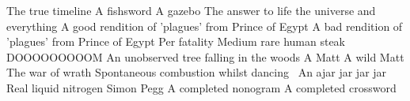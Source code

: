 \begin{multicols}{2}
\begin{small}
\begin{tabbing}
          {The true timeline}
          {A fishsword}
          {A gazebo}
           {The answer to life the universe and everything \FD}
           {A good rendition of 'plagues' from Prince of Egypt}
          {A bad rendition of 'plagues' from Prince of Egypt}
         {Per fatality}
          {Medium rare human steak}
           {DOOOOOOOOOM}
           {An unobserved tree falling in the woods}
           {A Matt}
           {A wild Matt}
           {The war of wrath}
         {Spontaneous combustion whilst dancing~\E}
           {An ajar jar jar jar}
          {Real liquid nitrogen}
          {Simon Pegg}
          {A completed nonogram}
          {A completed crossword}
    \end{tabbing}
  \end{small}
\end{multicols}

\vfill

\begin{center}
\end{center}

\vfill


